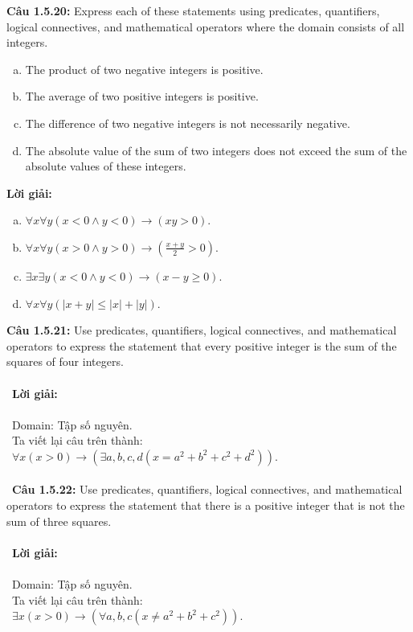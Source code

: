 \documentclass[a4paper]{article}
\begin{document}
\textbf{Câu 1.5.20: }Express each of these statements using predicates, quantifiers, logical connectives, and mathematical operators where the domain consists of all integers.
\begin{enumerate}[a)]
\item The product of two negative integers is positive.
\item The average of two positive integers is positive.
\item The difference of two negative integers is not necessarily negative.
\item The absolute value of the sum of two integers does not exceed the sum of the absolute values of these integers.
\end{enumerate}
\textbf{Lời giải: }
\begin{enumerate}[a)]
\item $\forall x \forall y (x < 0 \land y < 0) \rightarrow (xy > 0)$.
\item $\forall x \forall y (x > 0 \land y > 0) \rightarrow (\frac{x+y}{2} > 0)$.
\item $\exists x \exists y (x < 0 \land y < 0) \rightarrow (x-y \geq 0)$.
\item $\forall x \forall y (|x+y| \leq |x|+|y|)$.
\end{enumerate}
\textbf{Câu 1.5.21: }Use predicates, quantifiers, logical connectives, and mathematical operators to express the statement that every positive integer is the sum of the squares of four integers. \\\ \\\
\textbf{Lời giải: } \\\ \\\
Domain: Tập số nguyên. \\\
Ta viết lại câu trên thành: \\\
$\forall x (x > 0) \rightarrow (\exists a,b,c,d(x = a^2+b^2+c^2+d^2)).$ \\\ \\\
\textbf{Câu 1.5.22: }Use predicates, quantifiers, logical connectives, and mathematical operators to express the statement that there is a positive integer that is not the sum of three squares. \\\ \\\
\textbf{Lời giải:} \\\ \\\
Domain: Tập số nguyên. \\\
Ta viết lại câu trên thành: \\\
$\exists x (x > 0) \rightarrow (\forall a,b,c(x \neq a^2+b^2+c^2)).$\\\ \\\
\end{document}
